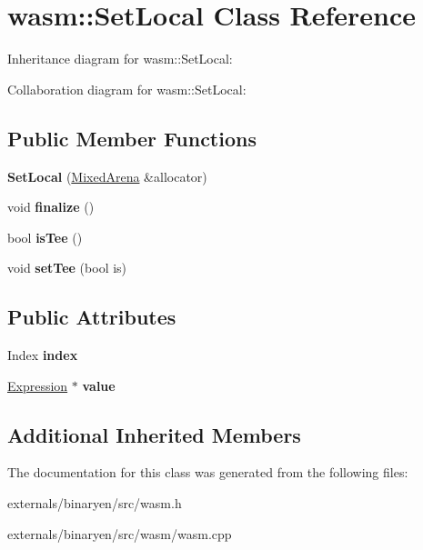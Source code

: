 \hypertarget{classwasm_1_1_set_local}{}\section{wasm\+:\+:Set\+Local Class Reference}
\label{classwasm_1_1_set_local}


Inheritance diagram for wasm\+:\+:Set\+Local\+:


Collaboration diagram for wasm\+:\+:Set\+Local\+:
\subsection*{Public Member Functions}
\begin{DoxyCompactItemize}
\item 
\mbox{\label{classwasm_1_1_set_local_a19180f7a5a2efd41c6b81dcd82b206c2}} 
{\bfseries Set\+Local} (\mbox{\hyperlink{struct_mixed_arena}{Mixed\+Arena}} \&allocator)
\item 
\mbox{\label{classwasm_1_1_set_local_af51a4fdf6bf14cd6bd5dbb00a78e5942}} 
void {\bfseries finalize} ()
\item 
\mbox{\label{classwasm_1_1_set_local_af3d6e476ea96ec5caafd825c7a4e2bac}} 
bool {\bfseries is\+Tee} ()
\item 
\mbox{\label{classwasm_1_1_set_local_ab713b1ff6a52217caef5db1e0ac623ae}} 
void {\bfseries set\+Tee} (bool is)
\end{DoxyCompactItemize}
\subsection*{Public Attributes}
\begin{DoxyCompactItemize}
\item 
\mbox{\label{classwasm_1_1_set_local_ac6461e80bcc1e8abb3d858094c5ac954}} 
Index {\bfseries index}
\item 
\mbox{\label{classwasm_1_1_set_local_a95ed4d78549fa2523c304516858540e8}} 
\mbox{\hyperlink{classwasm_1_1_expression}{Expression}} $\ast$ {\bfseries value}
\end{DoxyCompactItemize}
\subsection*{Additional Inherited Members}


The documentation for this class was generated from the following files\+:\begin{DoxyCompactItemize}
\item 
externals/binaryen/src/wasm.\+h\item 
externals/binaryen/src/wasm/wasm.\+cpp\end{DoxyCompactItemize}
